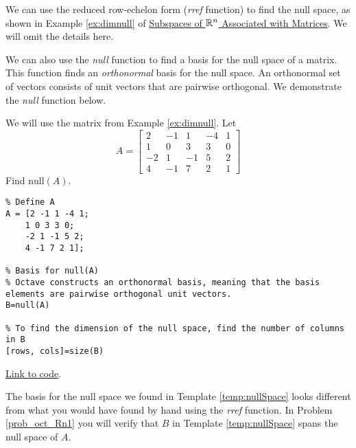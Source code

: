 \documentclass{ximera}
\begin{document}
We can use the reduced row-echelon form (\emph{rref} function) to find the null space, as shown in Example \ref{ex:dimnull} of \href{https://ximera.osu.edu/linearalgebradzv3/LinearAlgebraInteractiveIntro/VSP-0040/main}{Subspaces of $\mathbb{R}^n$ Associated with Matrices}.  We will omit the details here.

We can also use the \emph{null} function to find a basis for the null space of a matrix.  This function finds an \emph{orthonormal} basis for the null space.  An orthonormal set of vectors consists of unit vectors that are pairwise orthogonal.  We demonstrate the \emph{null} function below.

\begin{template}\label{temp:nullSpace}
    We will use the matrix from Example \ref{ex:dimnull}.  Let 
$$A=\begin{bmatrix}2&-1&1&-4&1\\1&0&3&3&0\\-2&1&-1&5&2\\4&-1&7&2&1\end{bmatrix}$$
Find $\mbox{null}(A)$.

\begin{verbatim}
% Define A
A = [2 -1 1 -4 1;
    1 0 3 3 0;
    -2 1 -1 5 2;
    4 -1 7 2 1];

% Basis for null(A)
% Octave constructs an orthonormal basis, meaning that the basis elements are pairwise orthogonal unit vectors.
B=null(A)

% To find the dimension of the null space, find the number of columns in B
[rows, cols]=size(B)
\end{verbatim}

\href{https://sagecell.sagemath.org/?z=eJxFj0FrwzAMhe-B_Id3KbTQjCbr2GHkkLD7LruVHlxXaQ2JVCynhf36yW3ZLDDo83t68gKfNAQmdGXRocWuQVWjRrVF_VEWsFNjg1erzbOvmvxe4w3Nk2xz-w7jeyNlsUDvNCgGieB5HJfdKsMvn9yV4IU1xdknhWNITGdhiZMbcciuNSZyHPiEdHbJLnpw0EgTcXZFwsWFeAtKD_9J2Owzh4Qr-SRRX8qib_-yc_q3wD56vA88BpukQSx-uIOshF6cp_W_iufpQDFLvIzzxIrA6MtiF-VmaxrUfavhh5b96hc072Hf&lang=octave&interacts=eJyLjgUAARUAuQ==}{Link to code}.
\end{template}

The basis for the null space we found in Template \ref{temp:nullSpace} looks different from what you would have found by hand using the \emph{rref} function. In Problem \ref{prob_oct_Rn1} you will verify that $B$ in Template \ref{temp:nullSpace} spans the null space of $A$.
\end{document}
